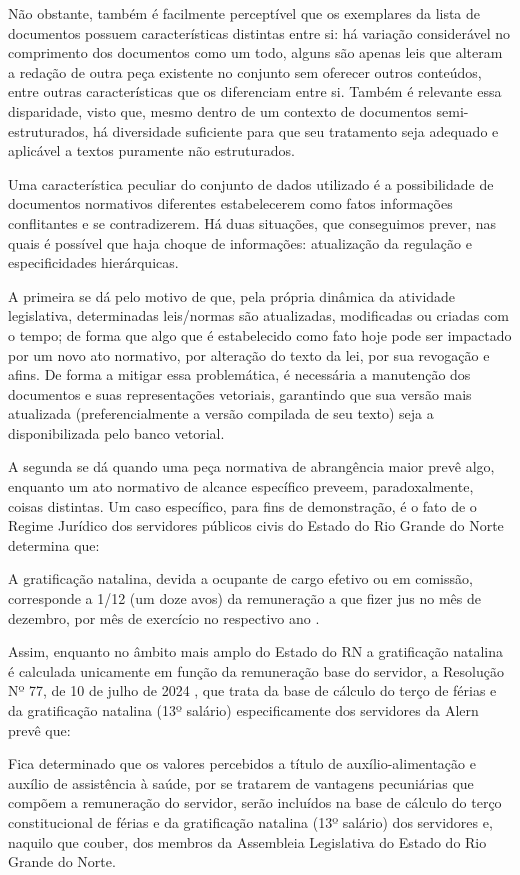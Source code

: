 Não obstante, também é facilmente perceptível que os exemplares da lista de documentos possuem características distintas entre si: há variação considerável no comprimento dos documentos como um todo, alguns são apenas leis que alteram a redação de outra peça existente no conjunto sem oferecer outros conteúdos, entre outras características que os diferenciam entre si. Também é relevante essa disparidade, visto que, mesmo dentro de um contexto de documentos semi-estruturados, há diversidade suficiente para que seu tratamento seja adequado e aplicável a textos puramente não estruturados.

Uma característica peculiar do conjunto de dados utilizado é a possibilidade de documentos normativos diferentes estabelecerem como fatos informações conflitantes e se contradizerem. Há duas situações, que conseguimos prever, nas quais é possível que haja choque de informações: atualização da regulação e especificidades hierárquicas.

A primeira se dá pelo motivo de que, pela própria dinâmica da atividade legislativa, determinadas leis/normas são atualizadas, modificadas ou criadas com o tempo; de forma que algo que é estabelecido como fato hoje pode ser impactado por um novo ato normativo, por alteração do texto da lei, por sua revogação e afins. De forma a mitigar essa problemática, é necessária a manutenção dos documentos e suas representações vetoriais, garantindo que sua versão mais atualizada (preferencialmente a versão compilada de seu texto) seja a disponibilizada pelo banco vetorial.

A segunda se dá quando uma peça normativa de abrangência maior prevê algo, enquanto um ato normativo de alcance específico preveem, paradoxalmente, coisas distintas. Um caso específico, para fins de demonstração, é o fato de o Regime Jurídico dos servidores públicos civis do Estado do Rio Grande do Norte determina que:

\begin{citacao}
    A gratificação natalina, devida a ocupante de cargo efetivo ou em comissão, corresponde a 1/12 (um doze avos) da remuneração a que fizer jus no mês de dezembro, por mês de exercício no respectivo ano \cite{RegimeJuridico:RN}.
\end{citacao}


Assim, enquanto no âmbito mais amplo do Estado do RN a gratificação natalina é calculada unicamente em função da remuneração base do servidor, a Resolução Nº 77, de 10 de julho de 2024 \cite{RegimentoInterno:ALRN}, que trata da base de cálculo do terço de férias e da gratificação natalina (13º salário) especificamente dos servidores da \ac{Alern} prevê que:
\begin{citacao}
    Fica determinado que os valores percebidos a título de auxílio-alimentação e auxílio de assistência à saúde, por se tratarem de vantagens pecuniárias que compõem a remuneração do servidor, serão incluídos na base de cálculo do terço constitucional de férias e da gratificação natalina (13º salário) dos servidores e, naquilo que couber, dos membros da Assembleia Legislativa do Estado do Rio Grande do Norte.
\end{citacao}

